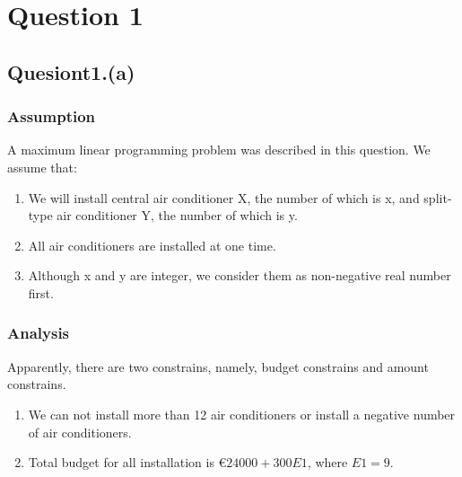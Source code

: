 \documentclass[titlepage,a4paper]{article}
\begin{document}
\section{Question 1}

\fi

\setlength{\parindent}{0pt}
\setlength{\parskip}{0.3em}

    \subsection{Quesiont1.(a)}
        \subsubsection{Assumption}
            A maximum linear programming problem was described in this question. We assume that:\\
            \begin{enumerate}
                \item We will install central air conditioner X, the number of which is x, and split-type air conditioner Y, the number of which is y. 
                \item All air conditioners are installed at one time.
                \item Although x and y are integer, we consider them as non-negative real number first.
            \end{enumerate}
    
        \subsubsection{Analysis}
            Apparently, there are two constrains, namely, budget constrains and amount constrains. \\
            \begin{enumerate}
                \item We can not install more than 12 air conditioners or install a negative number of air conditioners. 
                \item Total budget for all installation is \euro $24000 + 300E1$, where $E1 = 9$.
            \end{enumerate}
            
\end{document}
